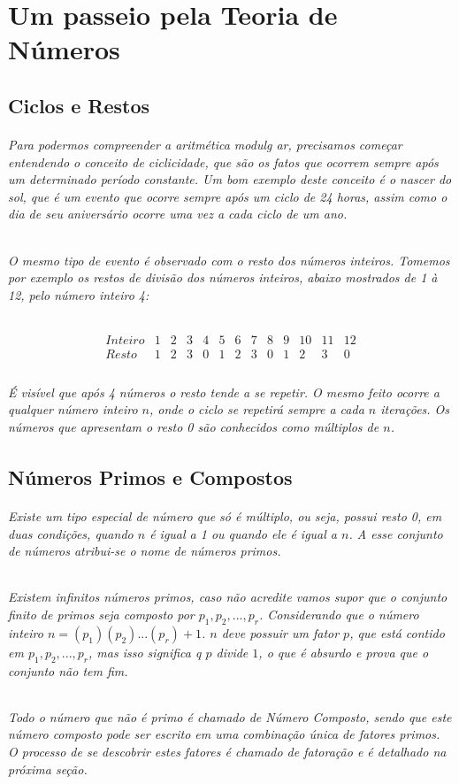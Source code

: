 \chapter {Um passeio pela Teoria de N\'umeros}
\label{Num}

\section{Ciclos e Restos}	
\subparagraph{
Para podermos compreender a aritm\'etica modulg ar, precisamos come\c{c}ar entendendo o conceito de ciclicidade, que s\~ao os fatos que ocorrem sempre ap\'os um determinado per\'iodo constante. Um bom exemplo deste conceito \'e o nascer do sol, que \'e um evento que ocorre sempre ap\'os um ciclo de {24} horas, assim como o dia de seu anivers\'ario ocorre uma vez a cada ciclo de um ano.
}
\subparagraph{
O mesmo tipo de evento \'e observado com o resto dos n\'umeros inteiros. Tomemos por exemplo os restos de divis\~ao dos n\'umeros inteiros, abaixo mostrados de 1 \`a 12, pelo n\'umero inteiro {4}:
}

\[
\begin{array}{ccccccccccccc}
  {Inteiro} & 1 & 2 & 3 & 4 & 5 & 6 & 7 & 8 & 9 & 10 &  11 & 12 \\  
	{Resto} & 1 & 2 & 3 & 0 & 1 & 2 & 3 & 0 & 1 & 2  &  3 & 0 \\ 
\end{array}
\]

\subparagraph{
\'E vis\'ivel que ap\'os {4} n\'umeros o resto tende a se repetir. O mesmo feito ocorre a qualquer n\'umero inteiro $n$, onde o ciclo se repetir\'a sempre a cada $n$ itera\c{c}\~oes. Os n\'umeros que apresentam o resto {0} s\~ao conhecidos como m\'ultiplos de $n$.
}

\section{N\'{u}meros Primos e Compostos}

\subparagraph{
Existe um tipo especial de n\'umero que s\'o \'e m\'ultiplo, ou seja, possui resto {0}, em duas condi\c{c}\~oes, quando $n$ \'e igual a {1} ou quando ele \'e igual a $n$. A esse conjunto de n\'umeros atribui-se o nome de \textit{n\'umeros primos}.
}
\subparagraph{
\textit{Existem infinitos n\'umeros primos}, caso n\~ao acredite vamos supor que o conjunto finito de primos seja composto por $p_{1},  p_{2}, ..., p_{r} $. Considerando que o n\'umero inteiro $n=(p_{1})(p_{2})...(p_{r}) + 1$. $n$ deve possuir um fator $p$, que est\'a contido em $p_{1},  p_{2}, ..., p_{r} $, mas isso significa q $p$ divide $1$, o que \'e absurdo e prova que o conjunto n\~ao tem fim.
}
\subparagraph{
Todo o n\'umero que n\~ao \'e primo \'e chamado de \textit{N\'umero Composto}, sendo que este n\'umero composto pode ser escrito em \textit {uma combina\c{c}\~ao \'unica de fatores primos}. O processo de se descobrir estes fatores \'e chamado de \textit{fatora\c{c}\~ao} e \'e detalhado na pr\'oxima seção.
}

